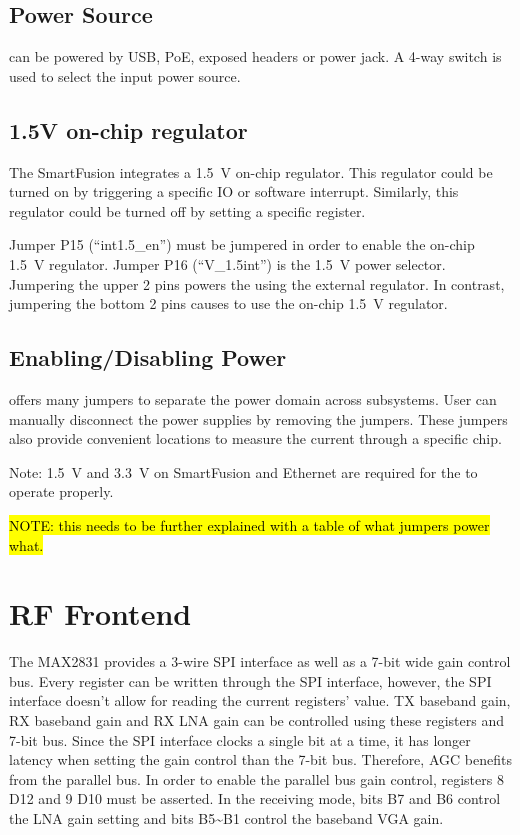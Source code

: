 \subsection{Power Source}
\sdr can be powered by USB, PoE, exposed headers or power jack. A 4-way switch is used to select
the input power source.

\subsection{1.5V on-chip regulator}
The SmartFusion integrates a 1.5~V on-chip regulator. This regulator could be turned on
by triggering a specific IO or software interrupt. Similarly, this regulator could
be turned off by setting a specific register.

Jumper P15 (``int1.5\_en'') must be jumpered in order to enable the on-chip 1.5~V regulator. Jumper P16 (``V\_1.5int'')
is the 1.5~V power selector. Jumpering the upper 2 pins powers the \sdr using the external
regulator. In contrast, jumpering the bottom 2 pins causes \sdr to use the on-chip 1.5~V regulator.

\subsection{Enabling/Disabling Power}
\sdr offers many jumpers to separate the power domain across subsystems. User can
manually disconnect the power supplies by removing the jumpers. These jumpers also provide
convenient locations to measure the current
through a specific chip.

Note: 1.5~V and 3.3~V on SmartFusion and Ethernet are required
for the \sdr to operate properly.

\hl{NOTE: this needs to be further explained with a table of what jumpers power what.}

\section{RF Frontend}
The MAX2831 provides a 3-wire SPI interface as well as a 7-bit wide gain control bus.
Every register can be written through the SPI interface, however, the SPI interface doesn't allow
for reading the current registers' value. TX baseband gain, RX baseband gain and
RX LNA gain can be controlled using these registers and 7-bit bus. Since the SPI interface clocks
a single bit at a time, it has longer latency when setting the gain control than the 7-bit bus.
Therefore, AGC benefits from the parallel bus.
In order to enable the parallel bus gain control, registers 8 D12 and 9 D10
must be asserted. In the receiving mode, bits B7 and B6 control the LNA gain setting and bits B5\~{}B1
control the baseband VGA gain.

